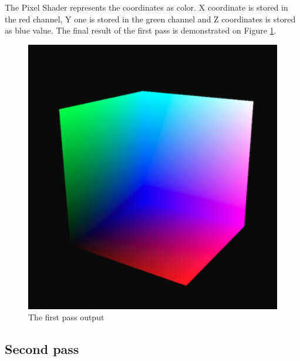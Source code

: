 \documentclass[twoside, english, 11pt]{report}
\begin{document}
The Pixel Shader represents the coordinates as color. X coordinate is stored in the red channel, Y one is stored in the green channel and Z coordinates is stored as blue value. The final result of the first pass is demonstrated on Figure \ref{fig:first}.
\begin{figure}[!h]
\centerline{\includegraphics[scale = 0.45]{img/first}}
\caption{The first pass output\label{fig:first}}
\end{figure}

\subsection{Second pass}
\end{document}
